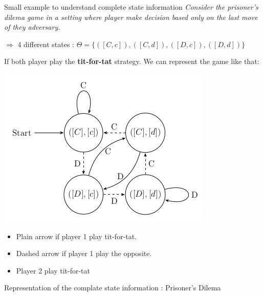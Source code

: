 \begin{frame}{Small example to understand complete state information}
\textit{Consider the prisoner's dilema game in a setting where player make decision based only on the last move of they adversary.} 

\pause
$\Rightarrow$ 4 different states : $\Theta = \{([C,c]), ([C,d]), ([D,c]), ([D,d])\}$

\pause
If both player play the \textbf{tit-for-tat} strategy. {\color{green} We can represent } the game like that:

\begin{minipage}{0.7\linewidth}
\includegraphics[width=0.9\linewidth]{img/titfortat.png}
\end{minipage}
\begin{minipage}{0.29\linewidth}
	\begin{itemize}
		\item Plain arrow if player 1 play tit-for-tat.
		\item Dashed arrow if player 1 play the opposite.
		\item Player 2 play tit-for-tat
	\end{itemize}
\end{minipage}
\end{frame}

\begin{frame}{Representation of the complate state information : Prisoner's Dilema}


\end{frame}


